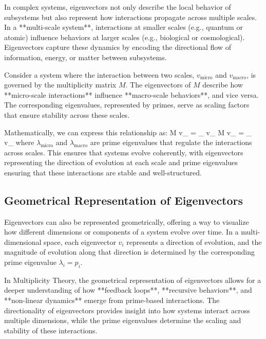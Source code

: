 \documentclass[12pt]{article}
\begin{document}
In complex systems, eigenvectors not only describe the local behavior of subsystems but also represent how interactions propagate across multiple scales. In a **multi-scale system**, interactions at smaller scales (e.g., quantum or atomic) influence behaviors at larger scales (e.g., biological or cosmological). Eigenvectors capture these dynamics by encoding the directional flow of information, energy, or matter between subsystems.

Consider a system where the interaction between two scales, \( v_{\text{micro}} \) and \( v_{\text{macro}} \), is governed by the multiplicity matrix \( M \). The eigenvectors of \( M \) describe how **micro-scale interactions** influence **macro-scale behaviors**, and vice versa. The corresponding eigenvalues, represented by primes, serve as scaling factors that ensure stability across these scales.

Mathematically, we can express this relationship as:
\]
M v_{} = \lambda_{} v_{} \quad {} \quad M v_{} = \lambda_{} v_{}
\]
where \( \lambda_{\text{micro}} \) and \( \lambda_{\text{macro}} \) are prime eigenvalues that regulate the interactions across scales. This ensures that systems evolve coherently, with eigenvectors representing the direction of evolution at each scale and prime eigenvalues ensuring that these interactions are stable and well-structured.

\subsection{Geometrical Representation of Eigenvectors}

Eigenvectors can also be represented geometrically, offering a way to visualize how different dimensions or components of a system evolve over time. In a multi-dimensional space, each eigenvector \( v_i \) represents a direction of evolution, and the magnitude of evolution along that direction is determined by the corresponding prime eigenvalue \( \lambda_i = p_i \).

In Multiplicity Theory, the geometrical representation of eigenvectors allows for a deeper understanding of how **feedback loops**, **recursive behaviors**, and **non-linear dynamics** emerge from prime-based interactions. The directionality of eigenvectors provides insight into how systems interact across multiple dimensions, while the prime eigenvalues determine the scaling and stability of these interactions.
\end{document}
